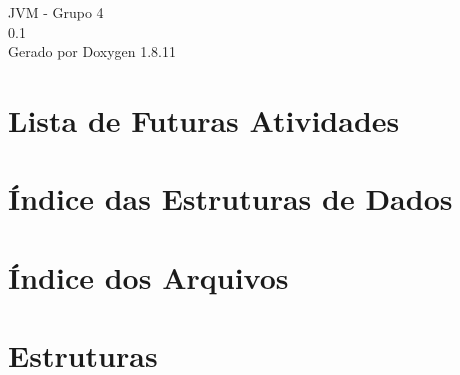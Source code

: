 \documentclass[twoside]{book}
\newcommand{\+}{\discretionary{\mbox{\scriptsize$\hookleftarrow$}}{}{}}
\newcommand{\clearemptydoublepage}{%
  \newpage{\pagestyle{empty}\cleardoublepage}%
}
\begin{document}
\hypersetup{pageanchor=false,
             bookmarksnumbered=true,
             pdfencoding=unicode
            }
\begin{titlepage}
\vspace*{7cm}
\begin{center}%
{\Large J\+VM -\/ Grupo 4 \\[1ex]\large 0.\+1 }\\
\vspace*{1cm}
{\large Gerado por Doxygen 1.8.11}\\
\end{center}
\end{titlepage}
\clearemptydoublepage
\tableofcontents
\clearemptydoublepage
{}
\hypersetup{pageanchor=true}

\chapter{Lista de Futuras Atividades}
\label{todo}
\hypertarget{todo}{}

\chapter{Índice das Estruturas de Dados}

\chapter{Índice dos Arquivos}

\chapter{Estruturas}
















































\end{document}

